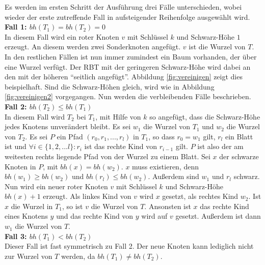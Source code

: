 \documentclass[a4paper,12pt]{article}
\begin{document}
Es werden im ersten Schritt der Ausführung drei Fälle unterschieden, wobei wieder der erste zutreffende Fall in aufsteigender Reihenfolge ausgewählt wird. \\
\noindent\textbf{Fall 1: $bh(T_1) = bh(T_2) = 0$ }\\   
In diesem Fall wird ein roter Knoten $v$ mit Schlüssel $k$ und Schwarz-Höhe $1$ erzeugt. An diesem werden zwei Sonderknoten angefügt. $v$ ist die Wurzel von $T$. \\
In den restlichen Fällen ist nun immer zumindest ein Baum vorhanden, der über eine Wurzel verfügt. Der RBT mit der geringeren Schwarz-Höhe wird dabei an den mit der höheren \enquote{seitlich angefügt}. Abbildung \ref{fig:vereinigen} zeigt dies beispielhaft. Sind die Schwarz-Höhen gleich, wird wie in Abbildung \ref{fig:vereinigen2} vorgegangen. Nun werden die verbleibenden Fälle beschrieben.\\
\noindent\textbf{Fall 2: $bh(T_2) \leq bh(T_1)$ }\\
In diesem Fall wird $T_2$ bei $T_1$, mit Hilfe von $k$ so angefügt, dass die Schwarz-Höhe jedes Knotens unverändert bleibt. Es sei $w_1$ die Wurzel von $T_1$ und $w_2$ die Wurzel von $T_2$. Es sei $P$ ein Pfad $(r_0,r_1,...,r_l)$ in $T_1$, so dass $r_0 = w_1$  gilt, $r_l$ ein Blatt ist und $\forall i \in \{1,2,...l\} \colon r_i$  ist das rechte Kind von  $r_{i-1}$ gilt. $P$ ist also der am weitesten rechts liegende Pfad von der Wurzel zu einem Blatt. Sei $x$ der schwarze Knoten in $P$, mit $\mathit{bh}(x) = \mathit{bh}(w_2)$. $x$ muss existieren, denn $\mathit{bh}(w_1) \geq \mathit{bh}(w_2)$ und $\mathit{bh}(r_l) \leq  \mathit{bh}(w_2)$. Außerdem sind $w_1$ und $r_l$ schwarz.\\
Nun wird ein neuer roter Knoten $v$ mit Schlüssel $k$ und Schwarz-Höhe \\ $\mathit{bh}(x) + 1$ erzeugt. Als linkes Kind von $v$  wird $x$ gesetzt, als rechtes Kind $w_2$. Ist $x$ die Wurzel in $T_1$, so ist $v$ die Wurzel von $T$. Ansonsten ist $x$ das rechte Kind eines Knotens $y$ und das rechte Kind von $y$ wird auf $v$ gesetzt. Außerdem ist dann $w_1$ die Wurzel von $T$.     \\  
\noindent\textbf{Fall 3: $bh(T_1) < bh(T_2)$ }\\ 
Dieser Fall ist fast symmetrisch zu Fall 2. Der neue Knoten kann lediglich nicht zur Wurzel von $T$ werden, da $bh(T_1) \neq bh(T_2)$.
\end{document}
